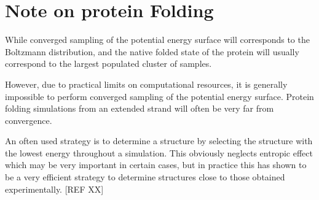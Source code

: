 \section{Note on protein Folding}
While converged sampling of the potential energy surface will corresponds to the Boltzmann distribution, and the native folded state of the protein will usually correspond to the largest populated cluster of samples.

However, due to practical limits on computational resources, it is generally impossible to perform converged sampling of the potential energy surface.
Protein folding simulations from an extended strand will often be very far from convergence.

An often used strategy is to determine a structure by selecting the structure with the lowest energy throughout a simulation.
This obviously neglects entropic effect which may be very important in certain cases, but in practice this has shown to be a very efficient strategy to determine structures close to those obtained experimentally. [REF XX]


